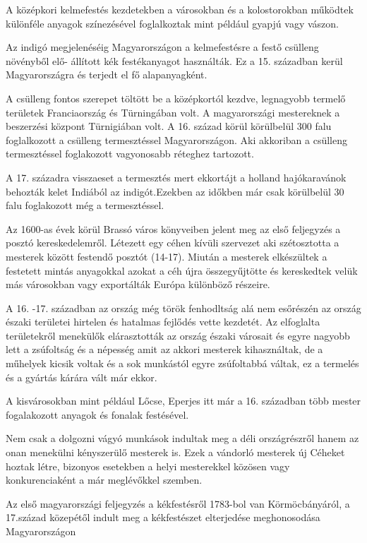 \documentclass[fontsize=12pt, appendixprefix=true]{scrreprt}
\begin{document}
A középkori kelmefestés kezdetekben a városokban és a kolostorokban működtek különféle anyagok színezésével foglalkoztak mint például gyapjú vagy vászon. 

Az indigó megjelenéséig Magyarországon a kelmefestésre a festő csülleng növényből elő- állított kék festékanyagot használták. Ez a 15. században  kerül Magyarországra és terjedt el fő alapanyagként.

A csülleng fontos szerepet töltött be a középkortól kezdve, legnagyobb termelő területek Franciaország és Türningában volt. A magyarországi mestereknek a beszerzési központ Türnigiában volt.
A 16. század körül körülbelül 300 falu foglalkozott a csülleng termesztéssel Magyarországon. Aki akkoriban a csülleng termesztéssel foglakozott vagyonosabb réteghez tartozott. 

A 17. századra visszaeset  a termesztés mert ekkortájt a holland hajókaravánok behozták kelet Indiából az indigót.Ezekben az időkben már csak körülbelül 30 falu foglakozott még a termesztéssel.

Az 1600-as évek körül Brassó város könyveiben jelent meg az első feljegyzés a posztó kereskedelemről.
Létezett egy céhen kívüli szervezet aki szétosztotta  a mesterek között festendő posztót \cite{domonkos1981magyarorszagi}(14-17).
Miután a mesterek elkészültek a festetett mintás anyagokkal azokat a céh újra összegyűjtötte és kereskedtek  velük más városokban vagy exportálták Európa különböző részeire.

A 16. -17. században az ország még török fenhodltság alá nem esőrészén az ország északi területei hirtelen és hatalmas fejlődés vette kezdetét.
Az elfoglalta területekről menekülők elárasztották az ország északi városait és egyre nagyobb lett a zsúfoltság és a népesség amit az akkori mesterek kihasználtak, de a műhelyek kicsik voltak és a sok munkástól egyre zsúfoltabbá váltak, ez a termelés és a gyártás kárára vált már ekkor.

A kisvárosokban mint például Lőcse, Eperjes itt már a 16. században több mester  fogalakozott anyagok és fonalak  festésével. 

Nem csak a dolgozni vágyó munkások indultak meg a déli országrészről hanem az onan menekülni kényszerülő mesterek is. Ezek a vándorló mesterek új Céheket hoztak létre, bizonyos esetekben a helyi mesterekkel közösen vagy konkurenciaként a már meglévőkkel szemben. 

Az első magyarországi feljegyzés a kékfestésről 1783-bol van Körmöcbányáról, a 17.század közepétől indult meg a kékfestészet elterjedése meghonosodása Magyarországon  %
\end{document}
